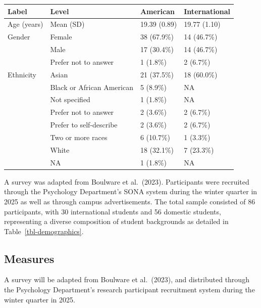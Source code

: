 \documentclass[
  man,
  floatsintext,
  longtable,
  nolmodern,
  notxfonts,
  notimes,
  colorlinks=true,linkcolor=blue,citecolor=blue,urlcolor=blue]{apa7}
\begin{document}
\begin{table}

{\caption{{Demographic Characteristics of
Participants}{\label{tbl-demographics}}}
\vspace{-20pt}}

\begin{longtable*}[t]{llll}
\toprule
Label & Level & American & International\\
\midrule
Age (years) & Mean (SD) & 19.39 (0.89) & 19.77 (1.10)\\
Gender & Female & 38 (67.9\%) & 14 (46.7\%)\\
 & Male & 17 (30.4\%) & 14 (46.7\%)\\
 & Prefer not to answer & 1 (1.8\%) & 2 (6.7\%)\\
Ethnicity & Asian & 21 (37.5\%) & 18 (60.0\%)\\
\addlinespace
 & Black or African American & 5 (8.9\%) & NA\\
 & Not specified & 1 (1.8\%) & NA\\
 & Prefer not to answer & 2 (3.6\%) & 2 (6.7\%)\\
 & Prefer to self-describe & 2 (3.6\%) & 2 (6.7\%)\\
 & Two or more races & 6 (10.7\%) & 1 (3.3\%)\\
\addlinespace
 & White & 18 (32.1\%) & 7 (23.3\%)\\
 & NA & 1 (1.8\%) & NA\\
\bottomrule
\end{longtable*}

\end{table}

A survey was adapted from Boulware et al.~(2023). Participants were
recruited through the Psychology Department's SONA system during the
winter quarter in 2025 as well as through campus advertisements. The
total sample consisted of 86 participants, with 30 international
students and 56 domestic students, representing a diverse composition of
student backgrounds as detailed in Table~\ref{tbl-demographics}.

\subsection{Measures}\label{measures}

A survey will be adapted from Boulware et al.~(2023), and distributed
through the Psychology Department's research participant recruitment
system during the winter quarter in 2025.
\end{document}

